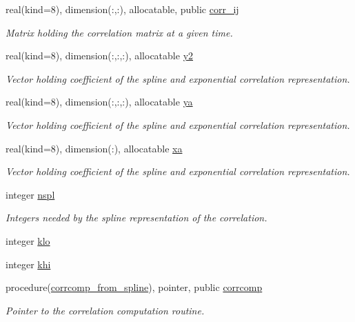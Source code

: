 \begin{DoxyCompactItemize}
real(kind=8), dimension(\+:,\+:), allocatable, public \hyperlink{namespacecorrmod_ad9983e0594dec7351fe398f0f2225c6f}{corr\+\_\+ij}
\begin{DoxyCompactList}\small\item\em Matrix holding the correlation matrix at a given time. \end{DoxyCompactList}\item 
real(kind=8), dimension(\+:,\+:,\+:), allocatable \hyperlink{namespacecorrmod_abd47fec6688f9997847712f6f44c7f08}{y2}
\begin{DoxyCompactList}\small\item\em Vector holding coefficient of the spline and exponential correlation representation. \end{DoxyCompactList}\item 
real(kind=8), dimension(\+:,\+:,\+:), allocatable \hyperlink{namespacecorrmod_aae7d37a1064807c18f234f1c74d46afc}{ya}
\begin{DoxyCompactList}\small\item\em Vector holding coefficient of the spline and exponential correlation representation. \end{DoxyCompactList}\item 
real(kind=8), dimension(\+:), allocatable \hyperlink{namespacecorrmod_a4af3bd2a2042f69a0fc89df8eba38de7}{xa}
\begin{DoxyCompactList}\small\item\em Vector holding coefficient of the spline and exponential correlation representation. \end{DoxyCompactList}\item 
integer \hyperlink{namespacecorrmod_afec60f4bfbbc2a787462f2475348c4c2}{nspl}
\begin{DoxyCompactList}\small\item\em Integers needed by the spline representation of the correlation. \end{DoxyCompactList}\item 
integer \hyperlink{namespacecorrmod_a25e22cc2633ad68b74ebc21589957554}{klo}
\item 
integer \hyperlink{namespacecorrmod_ac3bac71aa78c9e05401de3680f0c4ffc}{khi}
\item 
procedure(\hyperlink{namespacecorrmod_a4afc40b6c94d00fc18ccc378ad309a7f}{corrcomp\+\_\+from\+\_\+spline}), pointer, public \hyperlink{namespacecorrmod_ad42bfc9c0ec2cf55958a45b46839d856}{corrcomp}
\begin{DoxyCompactList}\small\item\em Pointer to the correlation computation routine. \end{DoxyCompactList}\end{DoxyCompactItemize}


